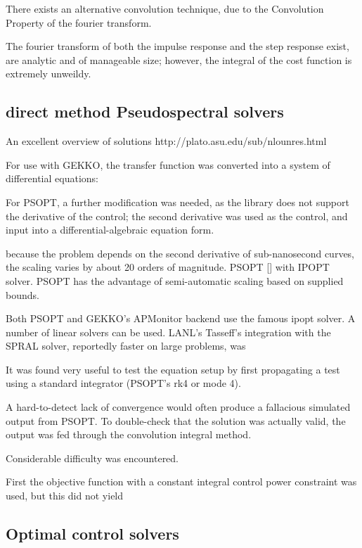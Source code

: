 \documentclass[fleqn,10pt]{paper}
\begin{document}
There exists an alternative convolution technique, due to the Convolution Property of the fourier transform.

The fourier transform of both the impulse response and the step response exist, are analytic and of manageable size; however, the integral of the cost function is extremely unweildy.

\subsection{direct method Pseudospectral solvers}

An excellent overview of solutions http://plato.asu.edu/sub/nlounres.html

For use with GEKKO, the transfer function was converted into a system of differential equations:

For PSOPT, a further modification was needed, as the library does not support the derivative of the control; the second derivative was used as the control, and input into a differential-algebraic equation form.



because the problem depends on the second derivative of sub-nanosecond curves, the scaling varies by about 20 orders of magnitude.
PSOPT [] with IPOPT\cite{implementation2006} solver. PSOPT has the advantage of semi-automatic scaling based on supplied bounds. 

Both PSOPT and GEKKO's APMonitor backend use the famous ipopt solver. A number of linear solvers can be used. LANL's Tasseff's integration with the SPRAL solver, reportedly faster on large problems, was 

It was found very useful to test the equation setup by first propagating a test using a standard integrator (PSOPT's rk4 or mode 4).

A hard-to-detect lack of convergence would often produce a fallacious simulated output from PSOPT. To double-check that the solution was actually valid, the output was fed through the convolution integral method.

Considerable difficulty was encountered. 

First the objective function with a constant integral control power constraint was used, but this did not yield

\subsection{Optimal control solvers}



\end{document}
